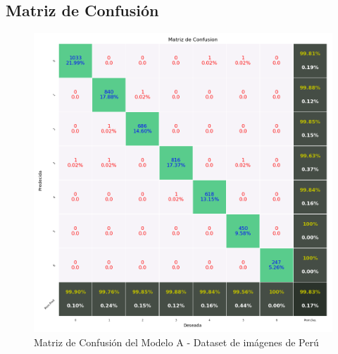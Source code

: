 	 	\subsection{Matriz de Confusión}  
			\begin{figure}[H]
				\begin{center}
				\includegraphics[width=1\textwidth]{images/desarrollo/testResults/peru/modelE} 
				\end{center}
				\begin{center}
				\caption{\small{Matriz de Confusión del Modelo A - Dataset de imágenes de Perú}}
				\vspace{-1em}
				{\small{\fontsize{10}{16.8}\selectfont {Fuente propia}}}
				\end{center}
				\vspace{-1.5em}
			\end{figure}
